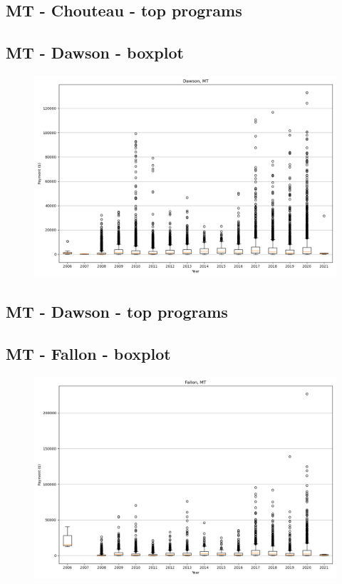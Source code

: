 \subsection*{MT - Chouteau - top programs}

\newpage
\subsection*{MT - Dawson - boxplot}
\begin{figure}[h]
\centering
\includegraphics[width=7in]{../output/boxplots/counties/Dawson-MT_boxplot.png}
\end{figure}


\subsection*{MT - Dawson - top programs}

\newpage
\subsection*{MT - Fallon - boxplot}
\begin{figure}[h]
\centering
\includegraphics[width=7in]{../output/boxplots/counties/Fallon-MT_boxplot.png}
\end{figure}


